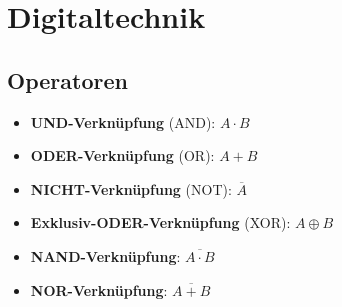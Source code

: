 \section{Digitaltechnik}
\subsection{Operatoren}
\begin{itemize}
    \item \textbf{UND-Verknüpfung} (AND): $A \cdot B$
    \item \textbf{ODER-Verknüpfung} (OR): $A + B$
    \item \textbf{NICHT-Verknüpfung} (NOT): $\overline{A}$
    \item \textbf{Exklusiv-ODER-Verknüpfung} (XOR): $A \oplus B$
    \item \textbf{NAND-Verknüpfung}: $\overline{A \cdot B}$
    \item \textbf{NOR-Verknüpfung}: $\overline{A + B}$
\end{itemize}
